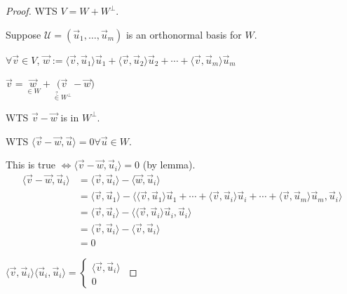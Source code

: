 \documentclass[11pt,fleqn]{book} %
\begin{document}
\begin{proof}
    WTS $V = W + W^\perp$.

    Suppose $\mathcal{U} = (\vec{u}_1, \dots, \vec{u}_m)$ is an orthonormal basis for $W$.

    $\forall \vec{v} \in V$, $\vec{w} := \langle \vec{v}, \vec{u}_1 \rangle\vec{u}_1 + \langle \vec{v}, \vec{u}_2 \rangle\vec{u}_2 + \cdots + \langle \vec{v}, \vec{u}_m \rangle\vec{u}_m$

    $\vec{v} = \underset{\in W}{\vec{w}} + \underset{\overset{?}{\in} W^\perp}{(\vec{v}} - \vec{w})$

    WTS $\vec{v} - \vec{w}$ is in $W^\perp$.

    WTS $\langle \vec{v} - \vec{w}, \vec{u} \rangle = 0 \forall \vec{u} \in W$.

    This is true $\iff \langle \vec{v} - \vec{w}, \vec{u}_i \rangle = 0$ (by lemma).
    \begin{align*}
        \langle \vec{v} - \vec{w}, \vec{u}_i \rangle
        &= \langle \vec{v}, \vec{u}_i \rangle - \langle \vec{w}, \vec{u}_i \rangle
        \\
        &= \langle \vec{v}, \vec{u}_1 \rangle - \langle \langle \vec{v}, \vec{u}_1 \rangle\vec{u}_1 + \cdots + \langle \vec{v}, \vec{u}_i \rangle\vec{u}_i + \cdots + \langle \vec{v}, \vec{u}_m \rangle \vec{u}_m, \vec{u}_i \rangle
        \\
        &= \langle \vec{v}, \vec{u}_i \rangle - \langle \langle \vec{v}, \vec{u}_i \rangle \vec{u}_i, \vec{u}_i \rangle
        \\
        &= \langle \vec{v}, \vec{u}_i \rangle - \langle \vec{v}, \vec{u}_i \rangle
        \\
        &= 0
    \end{align*}

$\langle \vec{v}, \vec{u}_i \rangle \langle \vec{u}_i, \vec{u}_i \rangle = \begin{cases} \langle \vec{v}, \vec{u}_i \rangle \\ 0  \end{cases}
$
\end{proof}
\end{document}
